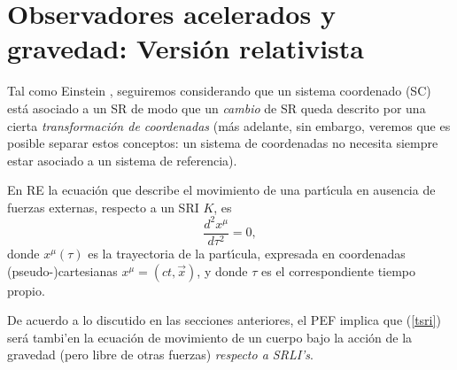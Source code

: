 \section{Observadores acelerados y gravedad: Versión  relativista}

Tal como Einstein \cite{Einstein56}, seguiremos considerando que un sistema coordenado (SC) está asociado a un SR de modo que un \textit{cambio} de SR queda descrito por una cierta \textit{transformación de  coordenadas} (más adelante, sin embargo, veremos que es posible separar estos conceptos: un sistema de coordenadas no necesita siempre estar asociado a un sistema de referencia).

En RE la ecuación que describe el movimiento de una part{\'\i}cula
en ausencia de fuerzas externas, respecto a un SRI $K$, es
\begin{equation}
\frac{d^2x^\mu}{d\tau ^2}=0, \label{tsri}
\end{equation}
donde $x^\mu(\tau )$ es la trayectoria de la part{\'\i}cula,
expresada en coordenadas (pseudo-)cartesianas $x^\mu=(ct,\vec{x})$, y donde $\tau $ es el correspondiente tiempo propio.

De acuerdo a lo discutido en las secciones anteriores, el PEF implica que (\ref{tsri}) será tambi'en la ecuación de movimiento de un cuerpo bajo la acción de la gravedad (pero libre de otras fuerzas) \textit{respecto a SRLI's}.


